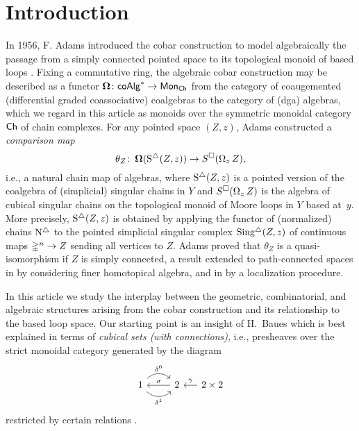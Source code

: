 
\section{Introduction}

In 1956, F. Adams introduced the cobar construction to model algebraically the passage from a simply connected pointed space to its topological monoid of based loops \cite{adams1956cobar}.
Fixing a commutative ring, the algebraic cobar construction may be described as a functor $\operatorname{\mathbf{\Omega}} \colon \mathsf{coAlg}^\ast \to \mathsf{Mon}_{\mathsf{Ch}}$ from the category of coaugemented  (differential graded coassociative) coalgebras to the category of (dga) algebras, which we regard in this article as monoids over the symmetric monoidal category $\mathsf{Ch}$ of chain complexes.
For any pointed space $(Z, z)$, Adams constructed a \textit{comparison map}
\begin{equation} \label{e:adams map}
\theta_Z \colon \operatorname{\mathbf{\Omega}}(\operatorname{S^{\triangle}}(Z, z)) \to S^{\square}(\operatorname{\Omega}_z Z),
\end{equation}
i.e., a natural chain map of algebras, where $\operatorname{S^{\triangle}}(Z,z)$ is a pointed version of the coalgebra of (simplicial) singular chains in $Y$ and $S^{\square}(\operatorname{\Omega}_zZ)$ is the algebra of cubical singular chains on the topological monoid of Moore loops in $Y$ based at~$y$.
More precisely, $\operatorname{S^{\triangle}}(Z,z)$ is obtained by applying the functor of (normalized) chains $\operatorname{N^{\triangle}}$ to the pointed simplicial singular complex $\operatorname{Sing^{\triangle}}(Z, z)$ of continuous maps $\mathbb{\Delta}^n \to Z$ sending all vertices to $Z$.
Adams proved that $\theta_Z$ is a quasi-isomorphism if $Z$ is simply connected, a result extended to path-connected spaces in \cite{rivera2018cubical} by considering finer homotopical algebra, and in \cite{hess2010cobar} by a localization procedure.

In this article we study the interplay between the geometric, combinatorial, and algebraic structures arising from the cobar construction and its relationship to the based loop space.
Our starting point is an insight of H.~Baues which is best explained in terms of \textit{cubical sets (with connections)}, i.e., presheaves over the 
strict monoidal category generated by the diagram
\begin{equation*}
\begin{tikzcd}
1 \arrow[r, out=45, in=135, "\delta^0"] \arrow[r, out=-45, in=-135, "\delta^1"'] & 2 \arrow[l, "\sigma"'] &[-10pt] \arrow[l, "\gamma"'] 2 \times 2
\end{tikzcd}
\end{equation*}
restricted by certain relations \cite{brown1981cubes, grandis2003cubical}.

